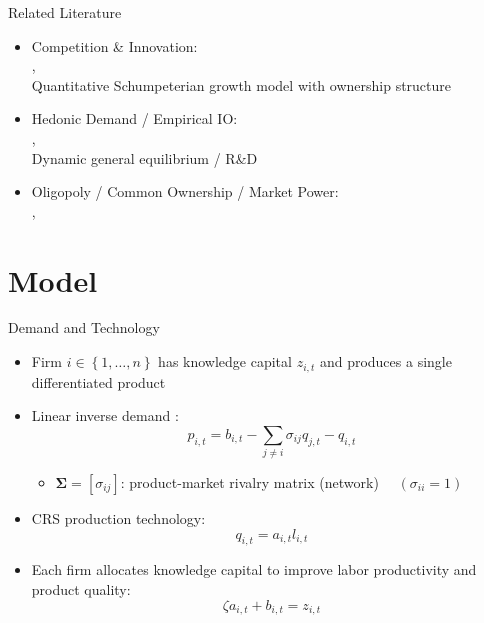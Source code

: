 \documentclass[
  10pt,
  aspectratio=169,   %
]{beamer}
\theoremstyle{plain}
\begin{document}
\begin{frame}{Related Literature}
  \begin{itemize}
    \item Competition \& Innovation: \\
          {\footnotesize\citet{d-Aspremont1988-je,Kamien1992-la,Aghion2001-yc,Aghion2005-vw,Acemoglu2012-bj,Aghion2013-nq,Bloom2013-pn,Lopez2019-sl,Peters2020-sd,Akcigit2021-ns,Akcigit2023-zl,Liu2022-iw,Cavenaile2023-lo}, \textbf{\citet{Hopenhayn2024-ya}}}\\
          \alert{Quantitative Schumpeterian growth model with ownership structure}
    \item Hedonic Demand / Empirical IO: \\
          {\footnotesize\citet{Lancaster1966-sg,Rosen1974-ep,Berry1995-lx,Nevo2001-ja}, \textbf{\citet{Pellegrino2024-dn,Ederer2024-rw}}}\\
          \alert{Dynamic general equilibrium / R\&D}
    \item Oligopoly / Common Ownership / Market Power: \\
          {\footnotesize\citet{Rubinstein1983-pi,Rotemberg1984-jz,Neary2003-sn,Atkeson2008-zc,Gutierrez2017-wl,He2017-ix,Azar2018-cc,Azar2022-cn,Autor2020-mr,Baqaee2020-eb,De_Loecker2020-jn,Azar2021-uh,Edmond2023-bg}, \textbf{\citet{Anton2023-ej,Anton2024-pw,Kini2024-kd}}}
  \end{itemize}
\end{frame}

\section{Model}

\begin{frame}{Demand and Technology}
  \begin{itemize}
    \item Firm $i\in \left\{1,\ldots,n\right\}$ has knowledge capital $z_{i,t}$ and produces a single differentiated product
          \medskip{}\pause
    \item Linear inverse demand \citep{Pellegrino2024-dn}: \[p_{i,t}=b_{i,t}-\sum_{j\neq i}\sigma_{ij}q_{j,t} - q_{i,t}\]
          \begin{itemize}
            \item $\bm{\Sigma}=\left[\sigma_{ij}\right]$: product-market rivalry matrix (network) $\quad (\sigma_{ii} = 1)$
          \end{itemize}
          \medskip{}\pause
    \item CRS production technology: \[q_{i,t}=a_{i,t}l_{i,t}\]\pause
    \item Each firm allocates knowledge capital to improve labor productivity and product quality:
          \[
            \zeta a_{i,t}+b_{i,t}=z_{i,t}
          \]
  \end{itemize}
\end{frame}
\end{document}
